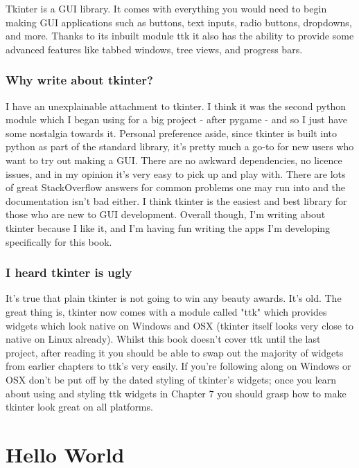 \documentclass[a4paper,11pt,openany]{book}
\begin{document}
Tkinter is a GUI library. It comes with everything you would need to begin making GUI applications such as buttons, text inputs, radio buttons, dropdowns, and more. Thanks to its inbuilt module ttk it also has the ability to provide some advanced features like tabbed windows, tree views, and progress bars. 

\subsection{Why write about tkinter?}

I have an unexplainable attachment to tkinter. I think it was the second python module which I began using for a big project - after pygame - and so I just have some nostalgia towards it. Personal preference aside, since tkinter is built into python as part of the standard library, it's pretty much a go-to for new users who want to try out making a GUI. There are no awkward dependencies, no licence issues, and in my opinion it's very easy to pick up and play with. There are lots of great StackOverflow answers for common problems one may run into and the documentation isn't bad either. I think tkinter is the easiest and best library for those who are new to GUI development. Overall though, I'm writing about tkinter because I like it, and I'm having fun writing the apps I'm developing specifically for this book.  

\subsection{I heard tkinter is ugly}

It's true that plain tkinter is not going to win any beauty awards. It's old. The great thing is, tkinter now comes with a module called "ttk" which provides widgets which look native on Windows and OSX (tkinter itself looks very close to native on Linux already). Whilst this book doesn't cover ttk until the last project, after reading it you should be able to swap out the majority of widgets from earlier chapters to ttk's very easily. If you're following along on Windows or OSX don't be put off by the dated styling of tkinter's widgets; once you learn about using and styling ttk widgets in Chapter 7 you should grasp how to make tkinter look great on all platforms.   

\chapter{Hello World}
\end{document}
